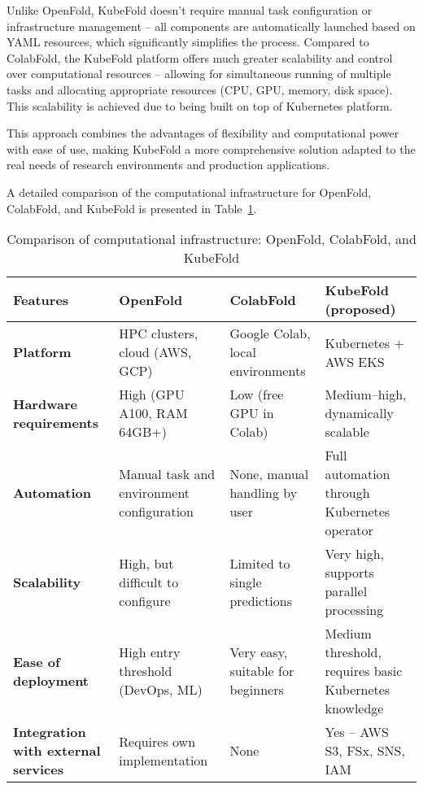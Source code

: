 Unlike OpenFold, KubeFold doesn't require manual task configuration or infrastructure management – all components are automatically launched based on YAML resources, which significantly simplifies the process.
Compared to ColabFold, the KubeFold platform offers much greater scalability and control over computational resources – allowing for simultaneous running of multiple tasks and allocating appropriate resources (CPU, GPU, memory, disk space).
This scalability is achieved due to being built on top of Kubernetes platform.

This approach combines the advantages of flexibility and computational power with ease of use, making KubeFold a more comprehensive solution adapted to the real needs of research environments and production applications.

A detailed comparison of the computational infrastructure for OpenFold, ColabFold, and KubeFold is presented in Table~\ref{tab:comparison}.

\begin{table}[H]
    \centering
    \small
    \begin{tabularx}{\textwidth}{|X|X|X|X|}
        \hline
        \textbf{Features}                           & \textbf{OpenFold}                         & \textbf{ColabFold}                & \textbf{KubeFold (proposed)}                          \\
        \hline
        \textbf{Platform}                           & HPC clusters, cloud (AWS, GCP)            & Google Colab, local environments & Kubernetes + AWS EKS \\
        \hline
        \textbf{Hardware requirements}              & High (GPU A100, RAM 64GB+)                & Low (free GPU in Colab) & Medium--high, dynamically scalable \\
        \hline
        \textbf{Automation}                         & Manual task and environment configuration & None, manual handling by user & Full automation through Kubernetes operator \\
        \hline
        \textbf{Scalability}                        & High, but difficult to configure          & Limited to single predictions & Very high, supports parallel processing \\
        \hline
        \textbf{Ease of deployment}                 & High entry threshold (DevOps, ML)         & Very easy, suitable for beginners & Medium threshold, requires basic Kubernetes knowledge \\
        \hline
        \textbf{Integration with external services} & Requires own implementation               & None                              & Yes – AWS S3, FSx, SNS, IAM                           \\
        \hline
    \end{tabularx}
    \caption{Comparison of computational infrastructure: OpenFold, ColabFold, and KubeFold}
    \label{tab:comparison}
\end{table}

